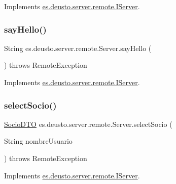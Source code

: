 Implements \mbox{\hyperlink{interfacees_1_1deusto_1_1server_1_1remote_1_1_i_server_ac293a07e02b5c832d25954fbbec4d92c}{es.\+deusto.\+server.\+remote.\+I\+Server}}.

\mbox{\label{classes_1_1deusto_1_1server_1_1remote_1_1_server_a37ccd2be0b3fbf0a80b356f132eca048}} 
\subsubsection{\texorpdfstring{sayHello()}{sayHello()}}
{\footnotesize\ttfamily String es.\+deusto.\+server.\+remote.\+Server.\+say\+Hello (\begin{DoxyParamCaption}{ }\end{DoxyParamCaption}) throws Remote\+Exception}



Implements \mbox{\hyperlink{interfacees_1_1deusto_1_1server_1_1remote_1_1_i_server_a9a2ee16746baf359dc7ac1fc4437eee8}{es.\+deusto.\+server.\+remote.\+I\+Server}}.

\mbox{\label{classes_1_1deusto_1_1server_1_1remote_1_1_server_ab26aaf2d539feae12e21a4f6328886a4}} 
\subsubsection{\texorpdfstring{selectSocio()}{selectSocio()}}
{\footnotesize\ttfamily \mbox{\hyperlink{classes_1_1deusto_1_1server_1_1dto_1_1_socio_d_t_o}{Socio\+D\+TO}} es.\+deusto.\+server.\+remote.\+Server.\+select\+Socio (\begin{DoxyParamCaption}\item[{String}]{nombre\+Usuario }\end{DoxyParamCaption}) throws Remote\+Exception}



Implements \mbox{\hyperlink{interfacees_1_1deusto_1_1server_1_1remote_1_1_i_server_a5268c08f2dd59d8ebc3864f7345c12f3}{es.\+deusto.\+server.\+remote.\+I\+Server}}.

